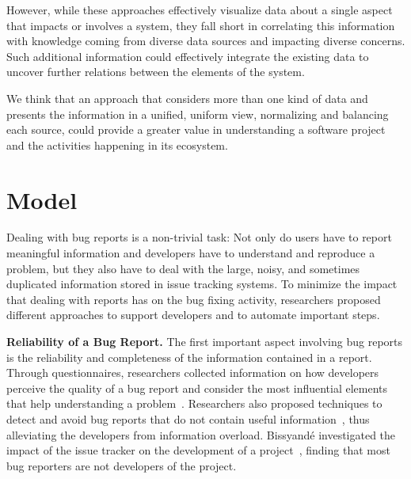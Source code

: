 However, while these approaches effectively visualize data about a single aspect that impacts or involves a system, they fall short in correlating this information with knowledge coming from diverse data sources and impacting diverse concerns.
Such additional information could effectively integrate the existing data to uncover further relations between the elements of the system.

We think that an approach that considers more than one kind of data and presents the information in a unified, uniform view, normalizing and balancing each source, could provide a greater value in understanding a software project and the activities happening in its ecosystem.




\section{Model} \label{sec:related-model}

Dealing with bug reports is a non-trivial task: Not only do users have to report meaningful information and developers have to understand and reproduce a problem, but they also have to deal with the large, noisy, and sometimes duplicated  information stored in issue tracking systems.
To minimize the impact that dealing with reports has on the bug fixing activity, researchers proposed different approaches to support developers and to automate important steps.

\textbf{Reliability of a Bug Report.} The first important aspect involving bug reports is the reliability and completeness of the information contained in a report.
Through questionnaires, researchers collected information on how developers perceive the quality of a bug report and consider the most influential elements that help understanding a problem~\cite{Zimm2010a,Bett2007,Schr2010a}.
Researchers also proposed techniques to detect and avoid bug reports that do not contain useful information~\cite{Sun2011}, thus alleviating the developers from information overload.
Bissyand\'e \etal investigated the impact of the issue tracker on the development of a project~\cite{Biss2013}, finding that most bug reporters are not developers of the project.

